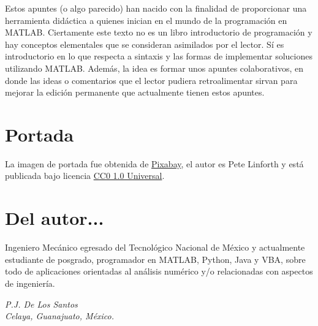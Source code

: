 Estos apuntes (o algo parecido) han nacido con la finalidad de
proporcionar una herramienta didáctica a quienes inician en el mundo de
la programación en MATLAB. Ciertamente este texto no es un libro
introductorio de programación y hay conceptos elementales que se
consideran asimilados por el lector. Sí es introductorio en lo que
respecta a sintaxis y las formas de implementar soluciones utilizando
MATLAB. Además, la idea es formar unos apuntes colaborativos, en donde
las ideas o comentarios que el lector pudiera retroalimentar sirvan para
mejorar la edición permanente que actualmente tienen estos apuntes.

\section*{Portada}

La imagen de portada fue obtenida de
\href{https://pixabay.com/es/nano-tecnolog\%C3\%ADa-construcci\%C3\%B3n-1480553/}{Pixabay},
el autor es Pete Linforth y está publicada bajo licencia
\href{https://creativecommons.org/publicdomain/zero/1.0/deed.es}{CC0 1.0
Universal}.

\section*{Del autor...}

Ingeniero Mecánico egresado del Tecnológico Nacional de México y
actualmente estudiante de posgrado, programador en MATLAB, Python, Java
y VBA, sobre todo de aplicaciones orientadas al análisis numérico y/o
relacionadas con aspectos de ingeniería.


\emph{P.J. De Los Santos} \\

\emph{Celaya, Guanajuato, México.}

